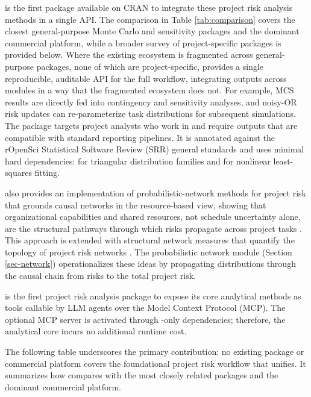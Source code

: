 \documentclass[
]{jss}
\begin{document}
 is the first package available on CRAN to integrate these
project risk analysis methods in a single API. The comparison in Table
\ref{tab:comparison} covers the closest general-purpose Monte Carlo and
sensitivity packages and the dominant commercial platform, while a
broader survey of project-specific  packages is provided
below. Where the existing ecosystem is fragmented across general-purpose
packages, none of which are project-specific,  provides a
single reproducible, auditable API for the full workflow, integrating
outputs across modules in a way that the fragmented ecosystem does not.
For example, MCS results are directly fed into contingency and
sensitivity analyses, and noisy-OR risk updates can re-parameterize task
distributions for subsequent simulations. The package targets project
analysts who work in  and require outputs that are
compatible with standard reporting pipelines. It is annotated against
the rOpenSci Statistical Software Review (SRR) general standards
\citep{rOpenSciStats2021} and uses minimal hard dependencies: 
\citep{mc2d} for triangular distribution families and 
\citep{Elzhov2016} for nonlinear least-squares fitting.

 also provides an  implementation of
probabilistic-network methods for project risk that grounds causal
networks in the resource-based view, showing that organizational
capabilities and shared resources, not schedule uncertainty alone, are
the structural pathways through which risks propagate across project
tasks \citep{Govan2014, Govan2016}. This approach is extended with
structural network measures that quantify the topology of project risk
networks \citep{Govan2020}. The probabilistic network module (Section
\ref{sec-network}) operationalizes these ideas by propagating
distributions through the causal chain from risks to the total project
risk.

 is the first project risk analysis package to expose its core
analytical methods as tools callable by LLM agents over the Model
Context Protocol (MCP). The optional MCP server is activated through
-only dependencies; therefore, the analytical core incurs
no additional runtime cost.

The following table underscores the primary contribution: no existing
 package or commercial platform covers the foundational
project risk workflow that  unifies. It summarizes how
 compares with the most closely related  packages
and the dominant commercial platform.
\end{document}
